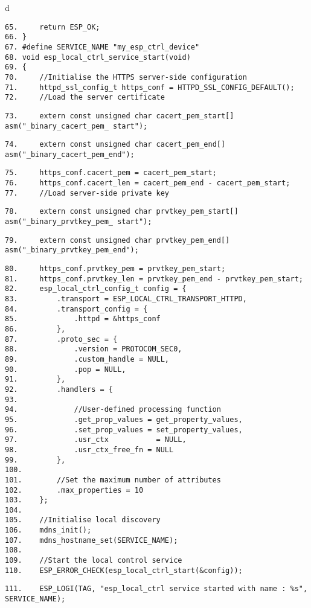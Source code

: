 \documentclass[a4paper,12pt]{book}
\begin{document}
\begin{codebloc}
\begin{tabular}{d}
\vspace{2pt}
\begin{verbatim}
65.     return ESP_OK;
66. }
67. #define SERVICE_NAME "my_esp_ctrl_device"
68. void esp_local_ctrl_service_start(void)
69. {
70.     //Initialise the HTTPS server-side configuration
71.     httpd_ssl_config_t https_conf = HTTPD_SSL_CONFIG_DEFAULT();
72.     //Load the server certificate
\end{verbatim}
\verb|73.     |\fontsize{9pt}{10pt}\selectfont\verb|extern const unsigned char cacert_pem_start[] asm("_binary_cacert_pem_ start");|

\footnotesize
\verb|74.     |\fontsize{9pt}{10pt}\selectfont\verb|extern const unsigned char cacert_pem_end[]   asm("_binary_cacert_pem_end");|
\footnotesize
\begin{verbatim}
75.     https_conf.cacert_pem = cacert_pem_start;
76.     https_conf.cacert_len = cacert_pem_end - cacert_pem_start;
77.     //Load server-side private key
\end{verbatim}
\verb|78.     |\fontsize{8.9pt}{10pt}\selectfont\verb|extern const unsigned char prvtkey_pem_start[] asm("_binary_prvtkey_pem_ start");|

\footnotesize
\verb|79.     |\fontsize{9pt}{10pt}\selectfont\verb|extern const unsigned char prvtkey_pem_end[] asm("_binary_prvtkey_pem_end");|
\footnotesize
\begin{verbatim}
80.     https_conf.prvtkey_pem = prvtkey_pem_start;
81.     https_conf.prvtkey_len = prvtkey_pem_end - prvtkey_pem_start;
82.     esp_local_ctrl_config_t config = {
83.         .transport = ESP_LOCAL_CTRL_TRANSPORT_HTTPD,
84.         .transport_config = {
85.             .httpd = &https_conf
86.         },
87.         .proto_sec = {
88.             .version = PROTOCOM_SEC0,
89.             .custom_handle = NULL,
90.             .pop = NULL,
91.         },
92.         .handlers = {
93.	
94.             //User-defined processing function
95.             .get_prop_values = get_property_values,
96.             .set_prop_values = set_property_values,
97.             .usr_ctx           = NULL,
98.             .usr_ctx_free_fn = NULL
99.         },
100.
101.        //Set the maximum number of attributes
102.        .max_properties = 10
103.    };
104.
105.    //Initialise local discovery
106.    mdns_init();
107.    mdns_hostname_set(SERVICE_NAME);
108.
109.    //Start the local control service
110.    ESP_ERROR_CHECK(esp_local_ctrl_start(&config));
\end{verbatim}
\verb|111.    |\fontsize{9pt}{10pt}\selectfont\verb|ESP_LOGI(TAG, "esp_local_ctrl service started with name : %s", SERVICE_NAME);|
\end{tabular}
\end{codebloc}
\end{document}
